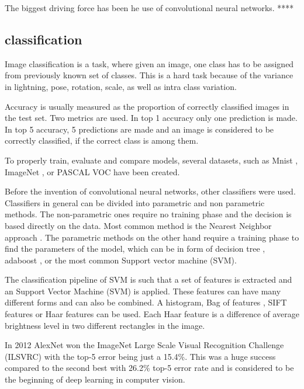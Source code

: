 \documentclass[a4paper,12pt,titlepage, twoside]{article}
\numberwithin{figure}{section}
\begin{document}
The biggest driving force has been he use of convolutional neural networks. 
****

\subsection{classification}

Image classification is a task, where given an image, one class has to be assigned from previously known set of classes. This is a hard task because of the variance in lightning, pose, rotation, scale, as well as intra class variation.  

Accuracy is usually measured as the proportion of correctly classified images in the test set. Two metrics are used. In top 1 accuracy only one prediction is made. In top 5 accuracy, 5 predictions are made and an image is considered to be correctly classified, if the correct class is among them.

To properly train, evaluate and compare models, several datasets, such as Mnist \cite{lecun-mnisthandwrittendigit-2010}, ImageNet \cite{deng2009imagenet}, or PASCAL VOC \cite{Everingham10} have been created.

Before the invention of convolutional neural networks, other classifiers were used. Classifiers in general can be divided into parametric and non parametric methods. The non-parametric ones require no training phase and the decision is based directly on the data. Most common method is the Nearest Neighbor approach \cite{boiman2008defense, zhang2006svm}. The parametric methods on the other hand require a training phase to find the parameters of the model, which can be in form of decision tree \cite{bosch2007image}, adaboost \cite{opelt2004weak}, or the most common Support vector machine (SVM).

The classification pipeline of SVM is such that a set of features is extracted and an Support Vector Machine (SVM) is applied. These features can have many different forms and can also be combined. A histogram\cite{chapelle1999support}, Bag of features \cite{lazebnik2006beyond, nowak2006sampling}, SIFT features \cite{yang2009linear, bicego2006use} or Haar features \cite{munder2006experimental} can be used. Each Haar feature is a difference of average brightness level in two different rectangles in the image. 

In 2012 AlexNet \cite{krizhevsky2012imagenet} won the ImageNet Large Scale Visual Recognition Challenge (ILSVRC) with the top-5 error being just a 15.4\%. This was a huge success compared to the second best with 26.2\% top-5 error rate and is considered to be the beginning of deep learning in computer vision. 
\end{document}

